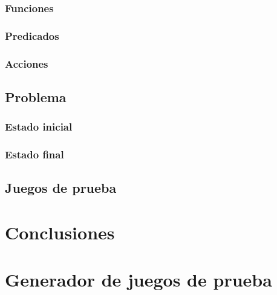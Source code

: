 \documentclass[12pt]{article}
\begin{document}
\subsubsection{Funciones}
\subsubsection{Predicados}
\subsubsection{Acciones}

\subsection{Problema}
\subsubsection{Estado inicial}
\subsubsection{Estado final}

\subsection{Juegos de prueba}


\section{Conclusiones}


\newpage
\appendix
\appendixpage
\addappheadtotoc

\section{Generador de juegos de prueba}
\end{document}
